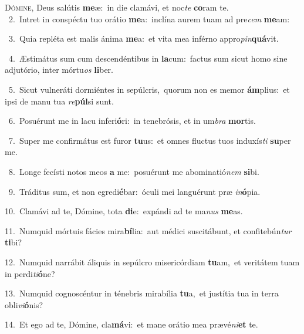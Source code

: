 \lettrine{\initial\textcolor{\initialcolor}{D}}{ómine,} Deus salútis \textbf{me}\-æ:~\star in die clamávi, et noc\textit{te} \textbf{co}\-ram te.\\
{\numbfont\textcolor{\numbcolor}{~2.}}~Intret in conspéctu tuo orátio \textbf{me}\-a:~\star inclína aurem tuam ad pre\textit{cem} \textbf{me}\-am:\par
{\numbfont\textcolor{\numbcolor}{~3.}}~Quia repléta est malis ánima \textbf{me}\-a:~\star et vita mea inférno appro\-\textit{pin}\-\textbf{quá}vit.\par
{\numbfont\textcolor{\numbcolor}{~4.}}~Æstimátus sum cum descendéntibus in \textbf{la}\-cum:~\star factus sum sicut homo sine adjutório, inter mórtu\textit{os} \textbf{li}\-ber.\par
{\numbfont\textcolor{\numbcolor}{~5.}}~Sicut vulneráti dormiéntes in sepúlcris,~\dagger quorum non es memor \textbf{ám}\-plius:~\star et ipsi de manu tua \textit{re}\-\textbf{púl}si sunt.\par
{\numbfont\textcolor{\numbcolor}{~6.}}~Posuérunt me in lacu inferi\-\textbf{ó}\-ri:~\star in tenebrósis, et in um\textit{bra} \textbf{mor}\-tis.\par
{\numbfont\textcolor{\numbcolor}{~7.}}~Super me confirmátus est furor \textbf{tu}\-us:~\star et omnes fluctus tuos induxís\textit{ti} \textbf{su}\-per me.\par
{\numbfont\textcolor{\numbcolor}{~8.}}~Longe fecísti notos meos \textbf{a} me:~\star posuérunt me abominatió\textit{nem} \textbf{si}\-bi.\par
{\numbfont\textcolor{\numbcolor}{~9.}}~Tráditus sum, et non egredi\-\textbf{é}\-bar:~\star óculi mei languérunt præ \textit{in}\-\textbf{ó}pia.\par
{\numbfont\textcolor{\numbcolor}{10.}}~Clamávi ad te, Dómine, tota \textbf{di}\-e:~\star expándi ad te ma\textit{nus} \textbf{me}\-as.\par
{\numbfont\textcolor{\numbcolor}{11.}}~Numquid mórtuis fácies mira\-\textbf{bí}\-lia:~\star aut médici suscitábunt, et confitebún\textit{tur} \textbf{ti}\-bi?\par
{\numbfont\textcolor{\numbcolor}{12.}}~Numquid narrábit áliquis in sepúlcro misericórdiam \textbf{tu}\-am,~\star et veritátem tuam in perdi\-\textit{ti}\-\textbf{ó}ne?\par
{\numbfont\textcolor{\numbcolor}{13.}}~Numquid cognoscéntur in ténebris mirabília \textbf{tu}\-a,~\star et justítia tua in terra obli\-\textit{vi}\-\textbf{ó}nis?\par
{\numbfont\textcolor{\numbcolor}{14.}}~Et ego ad te, Dómine, cla\-\textbf{má}\-vi:~\star et mane orátio mea prævé\-\textit{ni}\-\textbf{et} te.\par
